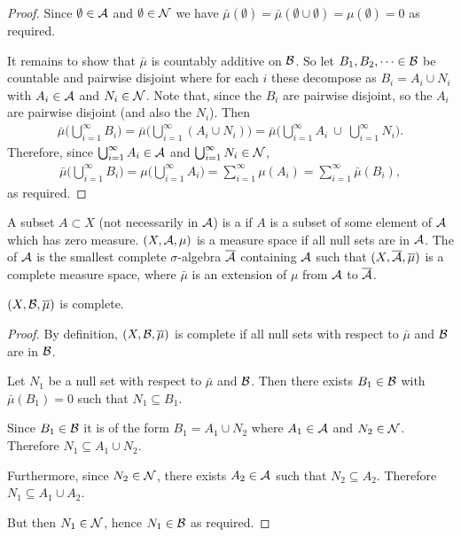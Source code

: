 \begin{proof}
  Since $\emptyset \in \mathcal A$ and $\emptyset \in \mathcal N$ we
  have $\bar\mu(\emptyset) = \bar\mu(\emptyset \cup \emptyset) = \mu(\emptyset) = 0$ as required.

  It remains to show that $\bar\mu$ is countably additive on $\mathcal B$. So let $B_1, B_2, \dots \in \mathcal B$ be
  countable and pairwise disjoint where for each $i$ these decompose as $B_i = A_i \cup N_i$
  with $A_i \in \mathcal A$ and $N_i \in \mathcal N$. Note that, since the $B_i$ are pairwise disjoint, so the $A_i$ are
  pairwise disjoint (and also the $N_i$). Then
  \begin{align*}
    \bar\mu\Big(\bigcup_{i=1}^\infty B_i\Big)
    = \bar\mu\Big(\bigcup_{i=1}^\infty (A_i \cup N_i)\Big)
    = \bar\mu\Big(\bigcup_{i=1}^\infty A_i ~\cup~ \bigcup_{i=1}^\infty N_i\Big).
  \end{align*}
  Therefore, since $\bigcup_{i=1}^\infty A_i \in \mathcal A$ and $\bigcup_{i=1}^\infty N_i \in \mathcal N$,
  \begin{align*}
    \bar\mu\Big(\bigcup_{i=1}^\infty B_i\Big)
    = \mu\Big(\bigcup_{i=1}^\infty A_i\Big)
    = \sum_{i=1}^\infty \mu(A_i)
    = \sum_{i=1}^\infty \bar\mu(B_i),
  \end{align*}
  as required.
\end{proof}



\begin{remark*}
  A subset $A \subset X$ (not necessarily in $\mathcal A$) is a  if $A$ is a subset of some element of
  $\mathcal A$ which has zero measure. $(X, \mathcal A, \mu)$ is a  measure space if all null sets are in
  $\mathcal A$. The  of $\mathcal A$ is the smallest complete $\sigma$-algebra $\overline{\mathcal A}$ containing
  $\mathcal A$ such that $(X, \overline{\mathcal A}, \overline \mu)$ is a complete measure space, where $\bar \mu$ is an extension
  of $\mu$ from $\mathcal A$ to $\overline{\mathcal A}$.
\end{remark*}

\begin{claim*}
  $(X, \mathcal B, \overline{\mu})$ is complete.
\end{claim*}

\begin{proof}
  By definition, $(X, \mathcal B, \overline{\mu})$ is complete if all null sets with respect to $\bar\mu$ and $\mathcal B$ are
  in $\mathcal B$.

  Let $N_1$ be a null set with respect to $\bar\mu$ and $\mathcal B$. Then there exists $B_1 \in \mathcal B$
  with $\bar\mu(B_1) = 0$ such that $N_1 \subseteq B_1$.

  Since $B_1 \in \mathcal B$ it is of the form $B_1 = A_1 \cup N_2$ where $A_1 \in \mathcal A$ and $N_2 \in \mathcal N$. Therefore
  $N_1 \subseteq A_1 \cup N_2$.

  Furthermore, since $N_2 \in \mathcal N$, there exists $A_2 \in \mathcal A$ such that $N_2 \subseteq A_2$.
  Therefore $N_1 \subseteq A_1 \cup A_2$.

  But then $N_1 \in \mathcal N$, hence $N_1 \in \mathcal B$ as required.
\end{proof}

